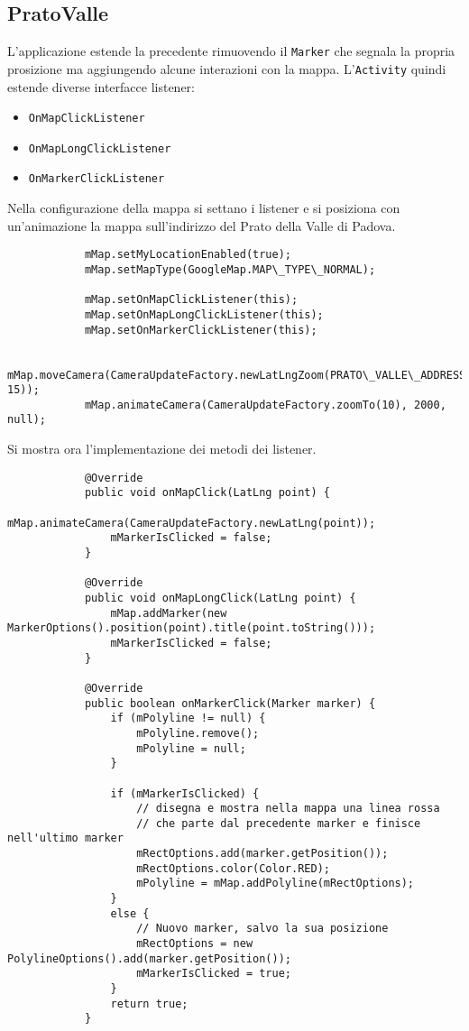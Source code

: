 	\subsection{PratoValle}
		L'applicazione estende la precedente rimuovendo il \lstinline|Marker| che segnala la propria prosizione ma aggiungendo alcune interazioni con la mappa. L'\lstinline|Activity| quindi estende diverse interfacce listener: 
		\begin{itemize}
			\item \lstinline|OnMapClickListener|
			\item \lstinline|OnMapLongClickListener| 
			\item \lstinline|OnMarkerClickListener|
		\end{itemize}
		Nella configurazione della mappa si settano i listener e si posiziona con un'animazione la mappa sull'indirizzo del Prato della Valle di Padova.
		\begin{lstlisting}
			mMap.setMyLocationEnabled(true);
			mMap.setMapType(GoogleMap.MAP\_TYPE\_NORMAL);
			
			mMap.setOnMapClickListener(this);
			mMap.setOnMapLongClickListener(this);
			mMap.setOnMarkerClickListener(this);
			
			mMap.moveCamera(CameraUpdateFactory.newLatLngZoom(PRATO\_VALLE\_ADDRESS, 15));
			mMap.animateCamera(CameraUpdateFactory.zoomTo(10), 2000, null);
		\end{lstlisting}
		Si mostra ora l'implementazione dei metodi dei listener.
		\begin{lstlisting}
			@Override
			public void onMapClick(LatLng point) {
				mMap.animateCamera(CameraUpdateFactory.newLatLng(point));	
				mMarkerIsClicked = false;
			}
			
			@Override
			public void onMapLongClick(LatLng point) {
				mMap.addMarker(new MarkerOptions().position(point).title(point.toString()));	
				mMarkerIsClicked = false;
			}
			
			@Override
			public boolean onMarkerClick(Marker marker) {
				if (mPolyline != null) {
					mPolyline.remove();
					mPolyline = null;
				}
			
				if (mMarkerIsClicked) {
					// disegna e mostra nella mappa una linea rossa 
					// che parte dal precedente marker e finisce nell'ultimo marker
					mRectOptions.add(marker.getPosition());
					mRectOptions.color(Color.RED);
					mPolyline = mMap.addPolyline(mRectOptions);
				} 
				else {
					// Nuovo marker, salvo la sua posizione
					mRectOptions = new PolylineOptions().add(marker.getPosition());
					mMarkerIsClicked = true;
				}
				return true;
			}
		\end{lstlisting}

